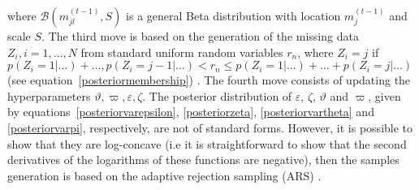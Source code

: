 \documentclass[journal,10pt]{elsart}
\begin{document}
where $\mathcal{B}({m}_{jl}^{{(t-1)}},S)$ is a general Beta distribution with location ${m}_{j}^{{(t-1)}}$ and scale $S$.
The third move is based on the
generation of the missing data $Z_i, i=1,\ldots,N$ from standard uniform random variables $r_n$, where $Z_i=j$ if
$p(Z_i=1|\ldots)+\ldots,p(Z_i=j-1|\ldots) < r_n \leq p(Z_i=1|\ldots)+\ldots+p(Z_i=j|\ldots)$ (see equation~\ref{posteriormembership}) \cite{Zhang2004}.
The
fourth move consists of updating the hyperparameters $\vartheta,\varpi,\varepsilon,\zeta$. The posterior distribution of $\varepsilon$, $\zeta$, $\vartheta$ and $\varpi$,
given by equations~\ref{posteriorvarepsilon}, \ref{posteriorzeta}, \ref{posteriorvartheta} and \ref{posteriorvarpi}, respectively, are not of standard forms.
However, it is possible to show that they are log-concave \cite{Applegate1991} (i.e it is straightforward to show that the second derivatives of the logarithms of these functions are negative), then the samples generation
is based on the adaptive rejection sampling (ARS)
\cite{Gilks1993}.
\end{document}
